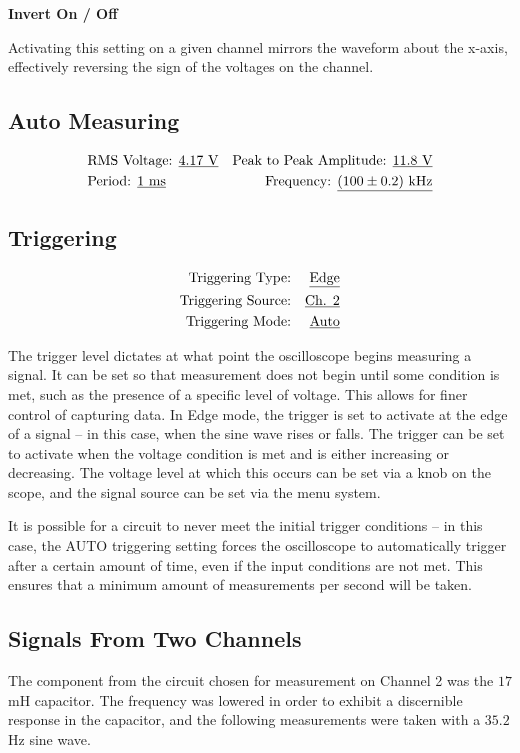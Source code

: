 \documentclass[twocolumn,english]{IEEEtran}
\theoremstyle{plain}
\theoremstyle{plain}
\begin{document}
\noindent\textbf{Invert On / Off}

Activating this setting on a given channel mirrors the waveform about the x-axis, effectively reversing the sign of the voltages on the channel.

\subsection{Auto Measuring}
\begin{align*}
 &\text{RMS Voltage: \underline{$4.17$ V}}	&\text{Peak to Peak Amplitude: \underline{$11.8$ V}} 	\\
 &\text{Period: \underline{$1$ ms}} 		&\text{Frequency: \underline{$(100 \pm 0.2)$ kHz}}	\\
\end{align*}

\subsection{Triggering}
\begin{align*}
 \text{Triggering Type:}&	&\text{\underline{Edge}}\\
 \text{Triggering Source:}&	&\text{\underline{Ch. 2}}\\
 \text{Triggering Mode:}&	&\text{\underline{Auto}}
\end{align*}

The trigger level dictates at what point the oscilloscope begins measuring a signal. It can be set so that measurement does not begin until some condition is met, such as the presence of a specific level of voltage. This allows for finer control of capturing data. In Edge mode, the trigger is set to activate at the edge of a signal -- in this case, when the sine wave rises or falls. The trigger can be set to activate when the voltage condition is met and is either increasing or decreasing. The voltage level at which this occurs can be set via a knob on the scope, and the signal source can be set via the menu system.

It is possible for a circuit to never meet the initial trigger conditions -- in this case, the AUTO triggering setting forces the oscilloscope to automatically trigger after a certain amount of time, even if the input conditions are not met. This ensures that a minimum amount of measurements per second will be taken.

\subsection{Signals From Two Channels}
The component from the circuit chosen for measurement on Channel 2 was the $17$ mH capacitor. The frequency was lowered in order to exhibit a discernible response in the capacitor, and the following measurements were taken with a $35.2$ Hz sine wave. \\
\end{document}
